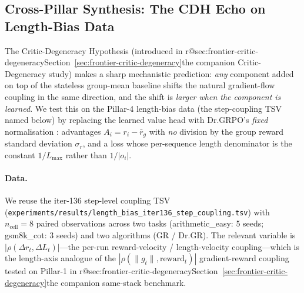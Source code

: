 %
%

\subsection{Cross-Pillar Synthesis: The CDH Echo on Length-Bias Data}
\label{sec:cdh-echo}

The Critic-Degeneracy Hypothesis (introduced in
\ifcsname r@sec:frontier-critic-degeneracy\endcsname Section~\ref{sec:frontier-critic-degeneracy}\else the companion Critic-Degeneracy study\fi) makes a sharp
mechanistic prediction: \emph{any} component added on top of the
stateless group-mean baseline shifts the natural gradient-flow
coupling in the same direction, and the shift is \emph{larger
when the component is learned}. We test this on the Pillar-4
length-bias data (the step-coupling TSV named below) by replacing
the learned value head with Dr.GRPO's \emph{fixed} normalisation
\citep{tong2025drgrpo}: advantages $A_i = r_i - \bar r_g$ with
\emph{no} division by the group reward standard deviation
$\sigma_r$, and a loss whose per-sequence length denominator is
the constant $1/L_{\max}$ rather than $1/|o_i|$.

\paragraph{Data.}
We reuse the iter-136 step-level coupling TSV
(\texttt{experiments/results/length\_bias\_iter136\_step\_coupling.tsv})
with $n_{\text{cell}} = 8$ paired observations across two tasks
(arithmetic\_easy: 5 seeds; gsm8k\_cot: 3 seeds) and two algorithms
(GR / Dr.GR). The relevant variable is
$|\rho(\Delta r_t,\Delta L_t)|$---the per-run reward-velocity /
length-velocity coupling---which is the length-axis analogue of
the $|\rho(\|g_t\|, \mathrm{reward}_t)|$ gradient-reward coupling
tested on Pillar-1 in \ifcsname r@sec:frontier-critic-degeneracy\endcsname Section~\ref{sec:frontier-critic-degeneracy}\else the companion same-stack benchmark\fi.

